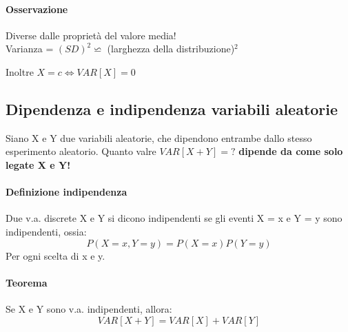 \documentclass[12pt, a4paper, openany]{book}
\begin{document}
\paragraph{Osservazione} Diverse dalle proprietà del valore media!
\\ Varianza = $(SD)^2 \backsimeq $ (larghezza della distribuzione)$^2$
\begin{center}
    Inoltre $X = c \Leftrightarrow VAR[X] = 0$
\end{center}

\subsection{Dipendenza e indipendenza variabili aleatorie}
Siano X e Y due variabili aleatorie, che dipendono entrambe dallo 
stesso esperimento aleatorio. Quanto valre $VAR[X+Y] = ?$
\textbf{dipende da come solo legate X e Y!}
\paragraph{Definizione indipendenza} Due v.a. discrete X e Y si dicono indipendenti
se gli eventi {X = x} e {Y = y} sono indipendenti, ossia:
\begin{equation*}
    P(X=x, Y=y) = P(X = x)P(Y = y)
\end{equation*}
Per ogni scelta di x e y.
\paragraph{Teorema} Se X e Y sono v.a. indipendenti, allora:
\begin{equation*}
    VAR[X+Y] = VAR[X] + VAR[Y]
\end{equation*}
\end{document}
